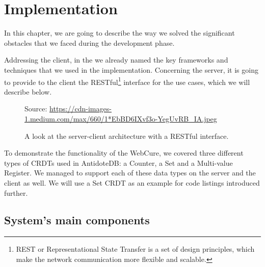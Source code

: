 \chapter{Implementation}
\label{Implementation}

In this chapter, we are going to describe the way we solved the significant obstacles that we faced during the development phase.

Addressing the client, in the  we already named the key frameworks and techniques that we used in the implementation. Concerning the server, it is going to provide to the client the RESTful\footnote{REST or Representational State Transfer is a set of design principles, which make the network communication more flexible and scalable\cite{40}.} interface for the use cases, which we will describe below.

\begin{figure}[!htb]
    \begin{center}
    \setlength{\fboxsep}{4pt}%
    \setlength{\fboxrule}{1pt}%
    {\scriptsize%
     Source: \url{https://cdn-images-1.medium.com/max/660/1*EbBD6IXvf3o-YegUvRB_IA.jpeg}}
    \caption {A look at the server-client architecture with a RESTful interface.}
    \label{fig:design1}
\end{center}
\end{figure}

To demonstrate the functionality of the WebCure, we covered three different types of CRDTs used in AntidoteDB: a Counter, a Set and a Multi-value Register. We managed to support each of these data types on the server and the client as well. We will use a Set CRDT as an example for code listings introduced further.

\section{System's main components}
\label{sysmaincomponents}

